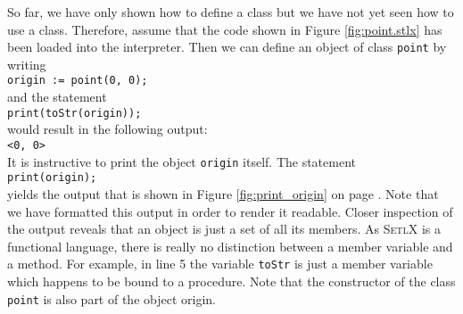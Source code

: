 So far, we have only shown how to define a class but we have not yet seen how to use a class.
Therefore, assume that the code shown in Figure \ref{fig:point.stlx} has been loaded into the
interpreter.   Then we can define an object of class \texttt{point} by writing
\\[0.2cm]
\hspace*{1.3cm}
\texttt{origin := point(0, 0);}
\\[0.2cm]
and the statement
\\[0.2cm]
\hspace*{1.3cm}
\texttt{print(toStr(origin));}
\\[0.2cm] 
would result in the following output:
\\[0.2cm]
\hspace*{1.3cm}
\texttt{<0, 0>}
\\[0.2cm]
It is instructive to print the object \texttt{origin} itself.  The statement 
\\[0.2cm]
\hspace*{1.3cm}
\texttt{print(origin);}
\\[0.2cm]
yields the output that is shown in Figure \ref{fig:print_origin} on page \pageref{fig:print_origin}.
Note that we have formatted this output in order to render it readable.  Closer inspection of the
output reveals that an object is just a set of all its members.  As \textsc{SetlX} is a functional
language, there is really no distinction between a member variable and a method.  For example, in
line 5 the variable \texttt{toStr} is just a member variable which happens to be bound to a
procedure.  Note that the constructor of the class \texttt{point} is also part of the object
origin.  

